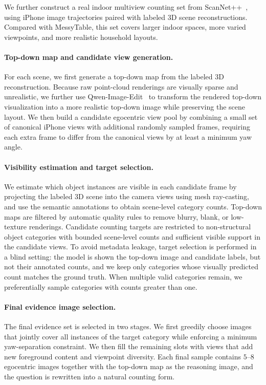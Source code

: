 We further construct a real indoor multiview counting set from ScanNet++~\cite{yeshwanth2023scannet++}, using iPhone image trajectories paired with labeled 3D scene reconstructions. Compared with MessyTable, this set covers larger indoor spaces, more varied viewpoints, and more realistic household layouts.

\paragraph{Top-down map and candidate view generation.}
For each scene, we first generate a top-down map from the labeled 3D reconstruction. Because raw point-cloud renderings are visually sparse and unrealistic, we further use Qwen-Image-Edit~\cite{wu2025qwenimagetechnicalreport} to transform the rendered top-down visualization into a more realistic top-down image while preserving the scene layout. We then build a candidate egocentric view pool by combining a small set of canonical iPhone views with additional randomly sampled frames, requiring each extra frame to differ from the canonical views by at least a minimum yaw angle.

\paragraph{Visibility estimation and target selection.}
We estimate which object instances are visible in each candidate frame by projecting the labeled 3D scene into the camera views using mesh ray-casting, and use the semantic annotations to obtain scene-level category counts. Top-down maps are filtered by automatic quality rules to remove blurry,
blank, or low-texture renderings. Candidate counting targets are restricted to non-structural object categories with bounded scene-level counts and sufficient visible support in the candidate views. To avoid metadata leakage, target selection is performed in a blind setting: the model is shown
the top-down image and candidate labels, but not their annotated counts, and we keep only categories whose visually predicted count matches the ground truth. When multiple valid categories remain, we preferentially sample categories with counts greater than one.

\paragraph{Final evidence image selection.}
The final evidence set is selected in two stages. We first greedily choose images that jointly cover all instances of the target category while enforcing a minimum yaw-separation constraint. We then fill the remaining slots with views that add new foreground content and viewpoint diversity.
Each final sample contains $5$--$8$ egocentric images together with the top-down map as the reasoning image, and the question is rewritten into a natural counting form.

